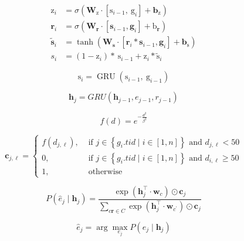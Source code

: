 \begin{equation}\begin{aligned} \mathrm{z}_{i} &=\sigma\left(\mathbf{W}_{\mathrm{z}} \cdot\left[\mathrm{s}_{i-1}, \mathrm{~g}_{i}\right]+\mathbf{b}_{\mathrm{z}}\right) \\ \mathbf{r}_{i} &=\sigma\left(\mathbf{W}_{\mathbf{r}} \cdot\left[\mathbf{s}_{i-1}, \mathbf{g}_{i}\right]+\mathrm{b}_{\mathbf{r}}\right) \\ \tilde{\mathbf{s}}_{i} &=\tanh \left(\mathbf{W}_{\mathbf{s}} \cdot\left[\mathbf{r}_{i} * \mathbf{s}_{i-1}, \mathbf{g}_{i}\right]+\mathbf{b}_{\mathrm{s}}\right) \\ s_{i} &=\left(1-\mathrm{z}_{i}\right) * \mathrm{~s}_{i-1}+\mathrm{z}_{i} * \tilde{\mathrm{s}}_{i} \end{aligned}\end{equation}

\begin{equation} \mathrm{s}_{i}=\operatorname{GRU}\left(\mathrm{s}_{i-1}, \mathrm{~g}_{i-1}\right) \end{equation}

\begin{equation} \mathbf{h}_{j}=G R U\left(\mathbf{h}_{j-1}, e_{j-1}, r_{j-1}\right) \end{equation}

\begin{equation} f(d)=e^{-\frac{d^{2}}{\beta^{2}}} \end{equation}

\begin{equation}
\mathbf{c}_{j, \ell}= \begin{cases}f\left(d_{j, \ell}\right), & \text { if } j \in\left\{g_{i} . t i d \mid i \in[1, n]\right\} \text { and } d_{j, \ell}<50 \\ 0, & \text { if } j \in\left\{g_{i} . t i d \mid i \in[1, n]\right\} \text { and } d_{i, \ell} \geq 50 \\ 1, & \text { otherwise }\end{cases}
\end{equation}

\begin{equation}
P\left(\hat{e}_{j} \mid \mathbf{h}_{j}\right)=\frac{\exp \left(\mathbf{h}_{j}^{\top} \cdot \mathbf{w}_{c}\right) \odot \mathbf{c}_{j}}{\sum_{c \boldsymbol{r} \in C} \exp \left(\mathbf{h}_{j}^{\top} \cdot \mathbf{w}_{c^{\prime}}\right) \odot \mathbf{c}_{j}}
\end{equation}

\begin{equation}\hat{e}_j = \arg \max_{e_j} P\left({e}_{j} \mid \mathbf{h}_{j}\right)\end{equation}

